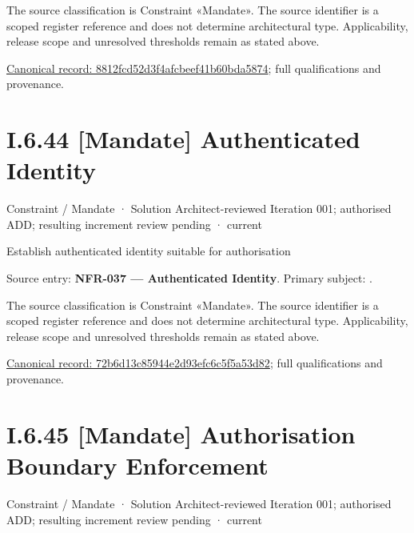 The source classification is Constraint «Mandate». The source identifier is a scoped register reference and does not determine architectural type. Applicability, release scope and unresolved thresholds remain as stated above.


{\footnotesize \href{../../../../../../../continuum/motivation/constraint/mandate/8812fcd52d3f4afcbeef41b60bda5874.md}{Canonical record: 8812fcd52d3f4afcbeef41b60bda5874}; full qualifications and provenance.}\par
\section*{I.6.44 [Mandate] Authenticated Identity}
\label{navigation:I.6.44}

\label{element:72b6d13c85944e2d93efc6c5f5a53d82}
{\small Constraint / Mandate · Solution Architect-reviewed Iteration 001; authorised ADD; resulting increment review pending · current}\par

Establish authenticated identity suitable for authorisation



Source entry: \textbf{NFR-037 — Authenticated Identity}. Primary subject: \texttt{}.



The source classification is Constraint «Mandate». The source identifier is a scoped register reference and does not determine architectural type. Applicability, release scope and unresolved thresholds remain as stated above.


{\footnotesize \href{../../../../../../../continuum/motivation/constraint/mandate/72b6d13c85944e2d93efc6c5f5a53d82.md}{Canonical record: 72b6d13c85944e2d93efc6c5f5a53d82}; full qualifications and provenance.}\par
\section*{I.6.45 [Mandate] Authorisation Boundary Enforcement}
\label{navigation:I.6.45}

\label{element:e04672ef7f2341b68c09a0348742a861}
{\small Constraint / Mandate · Solution Architect-reviewed Iteration 001; authorised ADD; resulting increment review pending · current}\par

